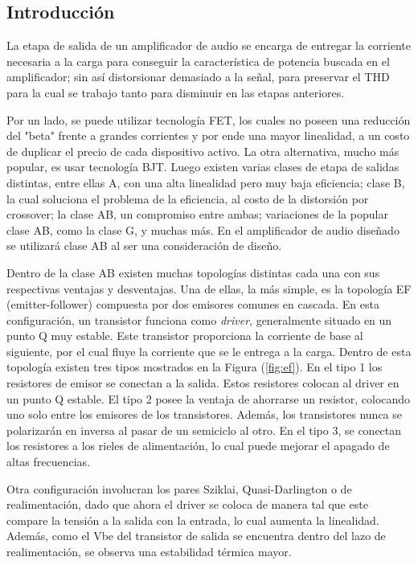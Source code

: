 



\subsection{Introducción}

La etapa de salida de un amplificador de audio se encarga de entregar la corriente necesaria a la carga para conseguir la característica de potencia buscada en el amplificador; sin así distorsionar demasiado a la señal, para preservar el THD para la cual se trabajo tanto para disminuir en las etapas anteriores.

Por un lado, se puede utilizar tecnología FET, los cuales no poseen una reducción del "beta" frente a grandes corrientes y por ende una mayor linealidad, a un costo de duplicar el precio de cada dispositivo activo. La otra alternativa, mucho más popular, es usar tecnología BJT. Luego existen varias clases de etapa de salidas distintas, entre ellas A, con una alta linealidad pero muy baja eficiencia; clase B, la cual soluciona el problema de la eficiencia, al costo de la distorsión por crossover; la clase AB, un compromiso entre ambas; variaciones de la popular clase AB, como la clase G, y muchas más.
En el amplificador de audio diseñado se utilizará clase AB al ser una consideración de diseño.

Dentro de la clase AB existen muchas topologías distintas cada una con sus respectivas ventajas y desventajas. Una de ellas, la más simple, es la topología EF (emitter-follower) compuesta por dos emisores comunes en cascada. En esta configuración, un transistor funciona como \textit{driver}, generalmente situado en un punto Q muy estable. Este transistor proporciona la corriente de base al siguiente, por el cual fluye la corriente que se le entrega a la carga. Dentro de esta topología existen tres tipos mostrados en la Figura (\ref{fig:ef}). En el tipo 1 los resistores de emisor se conectan a la salida. Estos resistores colocan al driver en un punto Q estable. El tipo 2 posee la ventaja de ahorrarse un resistor, colocando uno solo entre los emisores de los transistores. Además, los transistores nunca se polarizarán en inversa al pasar de un semiciclo al otro. En el tipo 3, se conectan los resistores a los rieles de alimentación, lo cual puede mejorar el apagado de altas frecuencias.

Otra configuración involucran los pares Sziklai, Quasi-Darlington o de realimentación, dado que ahora el driver se coloca de manera tal que este compare la tensión a la salida con la entrada, lo cual aumenta la linealidad. Además, como el Vbe del transistor de salida se encuentra dentro del lazo de realimentación, se observa una estabilidad térmica mayor.


